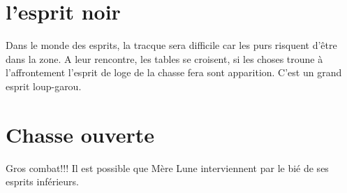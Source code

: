 \documentclass[oneside,12pt]{book}
\begin{document}
\begin{flushleft}
\section{l'esprit noir}
Dans le monde des esprits, la tracque sera difficile car les purs risquent d'être dans la zone. 
A leur rencontre, les tables se croisent, si les choses troune à l'affrontement l'esprit de loge de la chasse fera sont apparition. C'est un grand esprit loup-garou. 

\section{Chasse ouverte}
Gros combat!!! 
Il est possible que Mère Lune interviennent par le bié de ses esprits inférieurs. 

























\end{flushleft}
\end{document}
